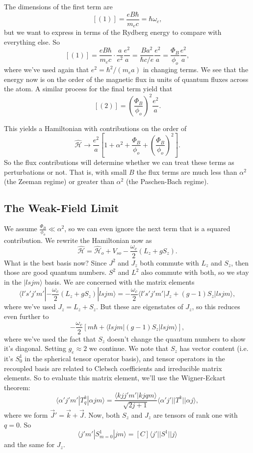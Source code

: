 \documentclass[fontsize=12pt]{scrartcl}
\newcommand{\la}{\langle}
\newcommand{\ra}{\rangle}
\newcommand{\Ham}{\hat{\mathcal{H}}}
\begin{document}
The dimensions of the first term are $$[(1)]=\frac{eB\hbar}{m_ec}=\hbar\omega_c,$$ but we want to express in terms of the Rydberg energy to compare with everything else. So $$[(1)]=\frac{eB\hbar}{m_ec}\cdot\frac{a}{e^2}\frac{e^2}{a}= \frac{Ba^2}{\hbar c/e}\frac{e^2}{a}=\frac{\Phi_B}{\phi_o}\frac{e^2}{a},$$ where we've used again that $e^2=\hbar^2/(m_ea)$ in changing terms. We see that the energy now is on the order of the magnetic flux in units of quantum fluxes across the atom. A similar process for the final term yield that $$[(2)]=\left(\frac{\Phi_B}{\phi_o}\right)^2\frac{e^2}{a}.$$

This yields a Hamiltonian with contributions on the order of $$\Ham \to \frac{e^2}{a}\left[1+\alpha^2+\frac{\Phi_B}{\phi_o}+\left(\frac{\Phi_B}{\phi_o}\right)^2\right].$$ So the flux contributions will determine whether we can treat these terms as perturbations or not. That is, with small $B$ the flux terms are much less than $\alpha^2$ (the Zeeman regime) or greater than $\alpha^2$ (the Paschen-Bach regime).

\subsection{The Weak-Field Limit}

We assume $\frac{\Phi_B}{\phi_o}\ll \alpha^2$, so we can even ignore the next term that is a squared contribution. We rewrite the Hamiltonian now as $$\Ham=\Ham_o+V_{so}-\frac{\omega_c}{2}(L_z+gS_z).$$ What is the best basis now? Since $J^2$ and $J_z$ both commute with $L_z$ and $S_z$, then those are good quantum numbers. $S^2$ and $L^2$ also commute with both, so we stay in the $|lsjm\ra$ basis. We are concerned with the matrix elements $$\la l's'j'm'|-\frac{\omega_c}{2}(L_z+gS_z)|lsjm\ra = -\frac{\omega_c}{2}\la l's'j'm'|J_z+(g-1)S_z|lsjm\ra,$$ where we've used $J_z=L_z+S_z$. But these are eigenstates of $J_z$, so this reduces even further to $$-\frac{\omega_c}{2}\left[m\hbar + \la lsjm|(g-1)S_z|lsjm\ra\right],$$ where we've used the fact that $S_z$ doesn't change the quantum numbers to show it's diagonal. Setting $g_e\approx 2$ we continue. We note that $S_z$ has vector content (i.e. it's $S^1_0$ in the spherical tensor operator basis), and tensor operators in the recoupled basis are related to Clebsch coefficients and irreducible matrix elements. So to evaluate this matrix element, we'll use the Wigner-Eckart theorem: $$\la \alpha'j'm'|T_q^k|\alpha jm\ra = \frac{\la kjj'm'|kjqm\ra}{\sqrt{2j+1}}\la \alpha'j'||T^k||\alpha j\ra,$$ where we form $\vec{J}'=\vec{k}+\vec{J}$. Now, both $S_z$ and $J_z$ are tensors of rank one with $q=0$. So $$\la j'm'|S_{m=0}^1|jm\ra = [C]\la j'||S^1||j\ra$$ and the same for $J_z$.
\end{document}
